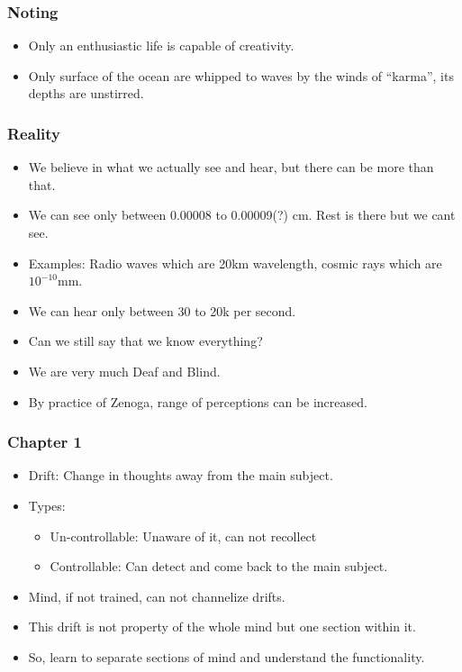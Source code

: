 \begin{frame}[fragile]
\frametitle{Noting}

\begin{itemize}
\item Only an enthusiastic life is capable of creativity.
\item Only surface of the ocean are whipped to waves by the winds of ``karma'', its depths are unstirred.
\end{itemize}


\end{frame}

\begin{frame}[fragile]
\frametitle{Reality}

\begin{itemize}
\item We believe in what we actually see and hear, but there can be more than that.
\item We can see only between 0.00008 to 0.00009(?) cm. Rest is there but we cant see.
\item Examples: Radio waves which are 20km wavelength, cosmic rays which are $10^{-10}$mm.
\item We can hear only between 30 to 20k per second.
\item Can we still say that we know everything?
\item We are very much Deaf and Blind.
\item By practice of Zenoga, range of perceptions can be increased.
\end{itemize}


\end{frame}

\begin{frame}[fragile]
\frametitle{Chapter 1}

\begin{itemize}
\item Drift: Change in thoughts away from the main subject.
\item Types:
\begin{itemize}
\item Un-controllable: Unaware of it, can not recollect
\item Controllable: Can detect and come back to the main subject.
\end{itemize}
\item Mind, if not trained, can not channelize drifts.
\item This drift is not property of the whole mind but one section within it.
\item So, learn to separate sections of mind and understand the functionality.
\end{itemize}


\end{frame}

